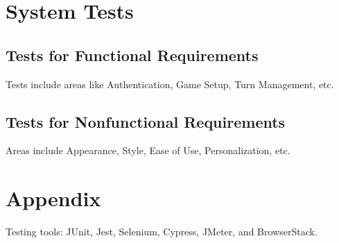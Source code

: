 \documentclass{article}
\begin{document}

\section{System Tests}
\subsection{Tests for Functional Requirements}
Tests include areas like Authentication, Game Setup, Turn Management, etc.

\subsection{Tests for Nonfunctional Requirements}
Areas include Appearance, Style, Ease of Use, Personalization, etc.

\section{Appendix}
Testing tools: JUnit, Jest, Selenium, Cypress, JMeter, and BrowserStack.
\end{document}
